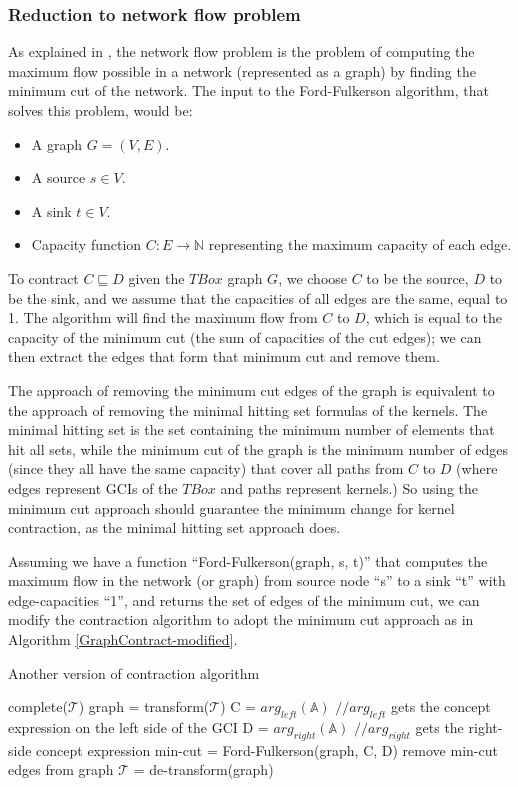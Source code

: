\documentclass{sfuthesis}
\theoremstyle{plain}
\theoremstyle{definition}
\begin{document}
\subsubsection{Reduction to network flow problem}
As explained in \cite{alg}, the network flow problem is the problem of computing the maximum flow possible in a network (represented as a graph) by finding the minimum cut of the network. The input to the Ford-Fulkerson algorithm, that solves this problem, would be:
\begin{itemize}
\item A graph $G = (V, E)$.
\item A source $s \in V$.
\item A sink $t \in V$.
\item Capacity function $C:E \rightarrow \mathbb{N}$ representing the maximum capacity of each edge.
\end{itemize}

To contract $C \sqsubseteq D$ given the $TBox$ graph $G$, we choose $C$ to be the source, $D$ to be the sink, and we assume that the capacities of all edges are the same, equal to 1. The algorithm will find the maximum flow from $C$ to $D$, which is equal to the capacity of the minimum cut (the sum of capacities of the cut edges); we can then extract the edges that form that minimum cut and remove them.

The approach of removing the minimum cut edges of the graph is equivalent to the approach of removing the minimal hitting set formulas of the kernels. The minimal hitting set is the set containing the minimum number of elements that hit all sets, while the minimum cut of the graph is the minimum number of edges (since they all have the same capacity) that cover all paths from $C$ to $D$ (where edges represent GCIs of the $TBox$ and paths represent kernels.) So using the minimum cut approach should guarantee the minimum change for kernel contraction, as the minimal hitting set approach does.

Assuming we have a function ``Ford-Fulkerson(graph, s, t)'' that computes the maximum flow in the network (or graph) from source node ``s'' to a sink  ``t'' with edge-capacities ``1'', and returns the set of edges of the minimum cut, we can modify the contraction algorithm to adopt the minimum cut approach as in Algorithm \ref{GraphContract-modified}.

\begin{algorithm}
\caption{Another version of contraction algorithm}
\label{GraphContract-modified}
\begin{algorithmic}[1]
\State complete($ \mathcal{T} $)
\State graph = transform($ \mathcal{T} $)
\State C = $arg_{left}(\mathbb{A})$ $//arg_{left}$ gets the concept expression on the left side of the GCI
\State D = $arg_{right}(\mathbb{A})$ $//arg_{right}$ gets the right-side concept expression
\State min-cut = Ford-Fulkerson(graph, C, D)
\State remove min-cut edges from graph
\State $ \mathcal{T} $ = de-transform(graph)
\EndFunction
\end{algorithmic}
\end{algorithm}
\end{document}
